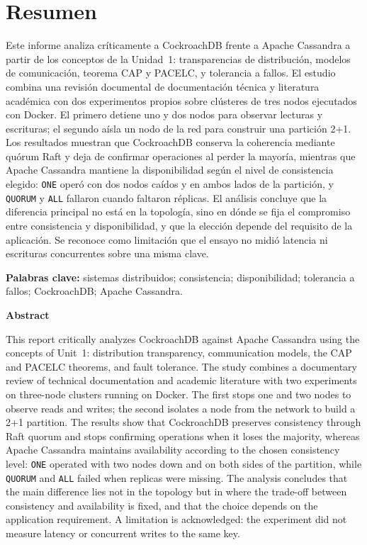 \documentclass[11pt,a4paper]{article}
\newcommand{\sistemaA}{CockroachDB}      %
\newcommand{\sistemaB}{Apache Cassandra} %
\begin{document}
\section*{Resumen}
\vspace{0.4cm}
{\large{}
\noindent Este informe analiza críticamente a \sistemaA{} frente a \sistemaB{} a
partir de los conceptos de la Unidad~1: transparencias de distribución, modelos de
comunicación, teorema CAP y PACELC, y tolerancia a fallos. El estudio combina una
revisión documental de documentación técnica y literatura académica con dos
experimentos propios sobre clústeres de tres nodos ejecutados con Docker. El primero
detiene uno y dos nodos para observar lecturas y escrituras; el segundo aísla un
nodo de la red para construir una partición 2+1. Los resultados muestran que
\sistemaA{} conserva la coherencia mediante quórum Raft y deja de confirmar
operaciones al perder la mayoría, mientras que \sistemaB{} mantiene la
disponibilidad según el nivel de consistencia elegido: \texttt{ONE} operó con dos
nodos caídos y en ambos lados de la partición, y \texttt{QUORUM} y \texttt{ALL}
fallaron cuando faltaron réplicas. El análisis concluye que la diferencia principal
no está en la topología, sino en dónde se fija el compromiso entre consistencia y
disponibilidad, y que la elección depende del requisito de la aplicación. Se
reconoce como limitación que el ensayo no midió latencia ni escrituras concurrentes
sobre una misma clave.\par}

\vspace{0.8cm}
\noindent\textbf{Palabras clave:} sistemas distribuidos; consistencia;
disponibilidad; tolerancia a fallos; \sistemaA{}; \sistemaB{}.

\vspace{0.5cm}
{\large\bfseries Abstract\par}
\vspace{0.2cm}
{\large{}
\noindent This report critically analyzes \sistemaA{} against \sistemaB{} using the
concepts of Unit~1: distribution transparency, communication models, the CAP and
PACELC theorems, and fault tolerance. The study combines a documentary review of
technical documentation and academic literature with two experiments on three-node
clusters running on Docker. The first stops one and two nodes to observe reads and
writes; the second isolates a node from the network to build a 2+1 partition. The
results show that \sistemaA{} preserves consistency through Raft quorum and stops
confirming operations when it loses the majority, whereas \sistemaB{} maintains
availability according to the chosen consistency level: \texttt{ONE} operated with
two nodes down and on both sides of the partition, while \texttt{QUORUM} and
\texttt{ALL} failed when replicas were missing. The analysis concludes that the main
difference lies not in the topology but in where the trade-off between consistency
and availability is fixed, and that the choice depends on the application
requirement. A limitation is acknowledged: the experiment did not measure latency or
concurrent writes to the same key.\par}
\end{document}
